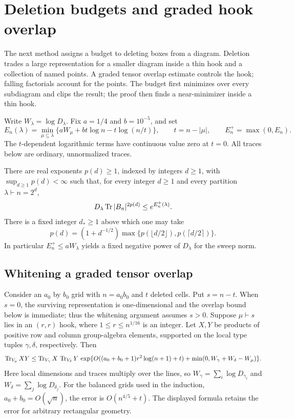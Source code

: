 \section{Deletion budgets and graded hook overlap}
\label{rec:sec-hook-budget}

The next method assigns a budget to deleting boxes from a diagram.
Deletion trades a large representation for a smaller diagram inside a
thin hook and a collection of named points.  A graded tensor overlap
estimate controls the hook; falling factorials account for the points.
The budget first minimizes over every subdiagram and clips the result;
the proof then finds a near-minimizer inside a thin hook.

Write $W_\lambda=\log D_\lambda$.  Fix $a=1/4$ and $b=10^{-5}$, and set
\begin{equation}\label{rec:deletion-budget}
 E_n(\lambda)=\min_{\mu\subseteq\lambda}
 \{aW_\mu+b t\log n-t\log(n/t)\},\qquad
 t=n-|\mu|,\qquad E_n^+=\max(0,E_n).
\end{equation}
The $t$-dependent logarithmic terms have continuous value zero at
$t=0$.  All traces below
are ordinary, unnormalized traces.

\begin{theorem}\label{rec:deletion-moment}
There are real exponents $p(d)\ge1$, indexed by integers $d\ge1$,
with $\sup_{d\ge1}p(d)<\infty$ such that, for every integer $d\ge1$
and every partition $\lambda\vdash n=2^d$,
\[
 D_\lambda\operatorname{Tr}|B_n|^{2p(d)}\le e^{E_n^+(\lambda)}.
\]
There is a fixed integer $d_*\ge1$ above which one may take
\[
 p(d)=(1+d^{-1/2})
       \max\{p(\lfloor d/2\rfloor),p(\lceil d/2\rceil)\}.
\]
In particular $E_n^+\le aW_\lambda$ yields a fixed negative power
of $D_\lambda$ for the sweep norm.
\end{theorem}

\subsection{Whitening a graded tensor overlap}

Consider an $a_0$ by $b_0$ grid with $n=a_0b_0$ and $t$ deleted
cells.  Put $s=n-t$.  When $s=0$, the surviving representation is
one-dimensional and the overlap bound below is immediate; thus the
whitening argument assumes $s>0$.  Suppose $\mu\vdash s$ lies in an $(r,r)$ hook,
where $1\le r\le n^{1/16}$ is an integer. Let $X,Y$ be products of
positive row and column group-algebra elements, supported on the
local type tuples $\gamma,\delta$, respectively. Then
\begin{equation}\label{rec:graded-hook-overlap}
 \operatorname{Tr}_{V_\mu}XY\le\operatorname{Tr}_{V_\gamma}X\,\operatorname{Tr}_{V_\delta}Y\,
 \exp\{O((a_0+b_0+1)r^2\log(n+1)+t)+\min(0,W_\gamma+W_\delta-W_\mu)\}.
\end{equation}
Here local dimensions and traces multiply over the lines, so
$W_\gamma=\sum_i\log D_{\gamma_i}$ and
$W_\delta=\sum_j\log D_{\delta_j}$. For the
balanced grids used in the induction, $a_0+b_0=O(\sqrt n)$, the
error is $O(n^{4/5}+t)$. The displayed formula retains the error for
arbitrary rectangular geometry.

